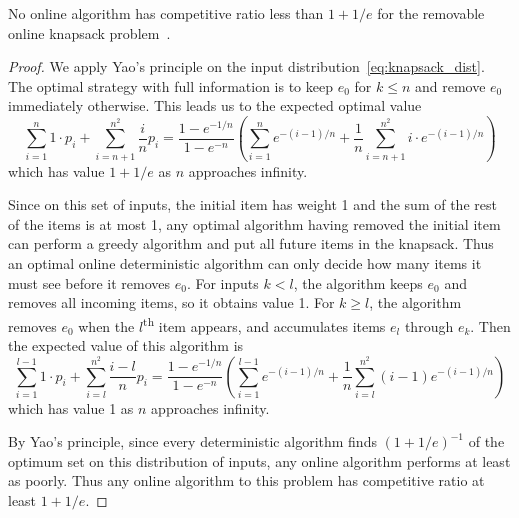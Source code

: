 \begin{theorem}
	No online algorithm has competitive ratio less than $1+1/e$ for the removable online knapsack problem~\cite{han}.
\end{theorem}
\begin{proof}
	We apply Yao's principle on the input distribution~\eqref{eq:knapsack_dist}. The optimal strategy with full information is to keep $e_0$ for $k\le n$ and remove $e_0$ immediately otherwise. This leads us to the expected optimal value
	\[ \sum_{i=1}^n 1\cdot p_i + \sum_{i=n+1}^{n^2} \frac{i}{n} p_i = \frac{1-e^{-1/n}}{1-e^{-n}} \left( \sum_{i=1}^n e^{-(i-1)/n} + \frac{1}{n} \sum_{i=n+1}^{n^2} i\cdot e^{-(i-1)/n} \right) \]
	which has value $1+1/e$ as $n$ approaches infinity.

	Since on this set of inputs, the initial item has weight 1 and the sum of the rest of the items is at most 1, any optimal algorithm having removed the initial item can perform a greedy algorithm and put all future items in the knapsack. Thus an optimal online deterministic algorithm can only decide how many items it must see before it removes $e_0$. For inputs $k<l$, the algorithm keeps $e_0$ and removes all incoming items, so it obtains value 1. For $k\ge l$, the algorithm removes $e_0$ when the $l$\textsuperscript{th} item appears, and accumulates items $e_l$ through $e_k$. Then the expected value of this algorithm is
	\[ \sum_{i=1}^{l-1} 1\cdot p_i + \sum_{i=l}^{n^2} \frac{i-l}{n} p_i = \frac{1-e^{-1/n}}{1-e^{-n}} \left( \sum_{i=1}^{l-1} e^{-(i-1)/n} + \frac{1}{n} \sum_{i=l}^{n^2} (i-1) e^{-(i-1)/n} \right) \]
which has value 1 as $n$ approaches infinity.

By Yao's principle, since every deterministic algorithm finds $(1+1/e)^{-1}$ of the optimum set on this distribution of inputs, any online algorithm performs at least as poorly. Thus any online algorithm to this problem has competitive ratio at least $1+1/e$.
\end{proof}


